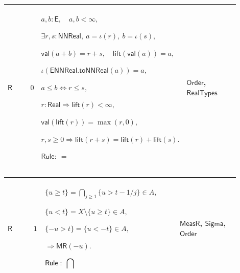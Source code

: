 \documentclass[12pt,reqno]{amsart}
\theoremstyle{blueplain}
\numberwithin{equation}{section}
\begin{document}
{\scriptsize \setlength{\parskip}{0pt}\nointerlineskip
\noindent 
\begin{tabular}{|@{}>{\centering\arraybackslash}m{0.10658\linewidth}|>{\centering\arraybackslash}m{0.03553\linewidth}|>{\centering\arraybackslash}m{0.52105\linewidth}|>{\centering\arraybackslash}m{0.23684\linewidth}|}
\hline
\hypertarget{dct:R0}{$\displaystyle \mathsf{R}$} & $\displaystyle 0$ & $%
\displaystyle a,b:\mathsf{E},\quad a,b<\infty,$\par$\displaystyle \exists
r,s:\mathsf{NNReal},\ a=\iota(r),\ b=\iota(s),$\par$\displaystyle \mathsf{val%
}(a+b)=r+s,\quad\mathsf{lift}(\mathsf{val}(a))=a,$\par$\displaystyle \iota(%
\mathsf{ENNReal.toNNReal}(a))=a,$\par$\displaystyle a\le
b\Longleftrightarrow r\le s,$\par$\displaystyle r:\mathsf{Real}\Rightarrow%
\mathsf{lift}(r)<\infty,$\par$\displaystyle \mathsf{val}(\mathsf{lift}%
(r))=\max(r,0),$\par$\displaystyle r,s\ge0\Rightarrow\mathsf{lift}(r+s)=%
\mathsf{lift}(r)+\mathsf{lift}(s).$\par$\displaystyle \mathsf{Rule}:\ =$ & 
\hyperlink{ax:Order}{$\displaystyle \mathsf{Order}$}, \hyperlink{dctdef:RealTypes}%
{$\displaystyle \mathsf{RealTypes}$} \\ \hline
\end{tabular}%
}

{\scriptsize \setlength{\parskip}{0pt}\nointerlineskip
\noindent 
\begin{tabular}{|@{}>{\centering\arraybackslash}m{0.10658\linewidth}|>{\centering\arraybackslash}m{0.03553\linewidth}|>{\centering\arraybackslash}m{0.52105\linewidth}|>{\centering\arraybackslash}m{0.23684\linewidth}|}
\hline
\hypertarget{dct:R1}{$\displaystyle \mathsf{R}$} & $\displaystyle 1$ & $%
\displaystyle \{u\ge t\}=\bigcap_{j\ge1}\{u>t-1/j\}\in A,$\par$\displaystyle %
\{u<t\}=X\setminus\{u\ge t\}\in A,$\par$\displaystyle \{-u>t\}=\{u<-t\}\in A,
$\par$\displaystyle \Rightarrow\mathsf{MR}(-u).$\par$\displaystyle \mathsf{%
Rule}:\ \bigcap$ & \hyperlink{dctdef:MeasR}{$\displaystyle \mathsf{MeasR}$}, 
\hyperlink{ax:Sigma}{$\displaystyle \mathsf{Sigma}$}, \hyperlink{ax:Order}{$%
\displaystyle \mathsf{Order}$} \\ \hline
\end{tabular}%
}
\end{document}
